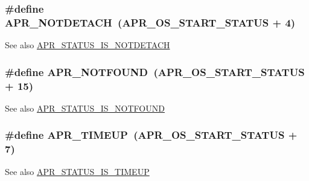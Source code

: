\subsubsection[{\texorpdfstring{A\+P\+R\+\_\+\+N\+O\+T\+D\+E\+T\+A\+CH}{APR_NOTDETACH}}]{\setlength{\rightskip}{0pt plus 5cm}\#define A\+P\+R\+\_\+\+N\+O\+T\+D\+E\+T\+A\+CH~({\bf A\+P\+R\+\_\+\+O\+S\+\_\+\+S\+T\+A\+R\+T\+\_\+\+S\+T\+A\+T\+US} + 4)}\hypertarget{group___a_p_r___error_ga83b8407fb5de5840f51dfd2c1439987b}{}\label{group___a_p_r___error_ga83b8407fb5de5840f51dfd2c1439987b}
\begin{DoxySeeAlso}{See also}
\hyperlink{group___a_p_r___s_t_a_t_u_s___i_s_gaa1700876a02293e3ed905fa03f360bbf}{A\+P\+R\+\_\+\+S\+T\+A\+T\+U\+S\+\_\+\+I\+S\+\_\+\+N\+O\+T\+D\+E\+T\+A\+CH} 
\end{DoxySeeAlso}
\subsubsection[{\texorpdfstring{A\+P\+R\+\_\+\+N\+O\+T\+F\+O\+U\+ND}{APR_NOTFOUND}}]{\setlength{\rightskip}{0pt plus 5cm}\#define A\+P\+R\+\_\+\+N\+O\+T\+F\+O\+U\+ND~({\bf A\+P\+R\+\_\+\+O\+S\+\_\+\+S\+T\+A\+R\+T\+\_\+\+S\+T\+A\+T\+US} + 15)}\hypertarget{group___a_p_r___error_ga9bd83273ff02f31f71fb4dc6f29df4a9}{}\label{group___a_p_r___error_ga9bd83273ff02f31f71fb4dc6f29df4a9}
\begin{DoxySeeAlso}{See also}
\hyperlink{group___a_p_r___s_t_a_t_u_s___i_s_ga0e6bd21f26cdce4ab23618816a1b6def}{A\+P\+R\+\_\+\+S\+T\+A\+T\+U\+S\+\_\+\+I\+S\+\_\+\+N\+O\+T\+F\+O\+U\+ND} 
\end{DoxySeeAlso}
\subsubsection[{\texorpdfstring{A\+P\+R\+\_\+\+T\+I\+M\+E\+UP}{APR_TIMEUP}}]{\setlength{\rightskip}{0pt plus 5cm}\#define A\+P\+R\+\_\+\+T\+I\+M\+E\+UP~({\bf A\+P\+R\+\_\+\+O\+S\+\_\+\+S\+T\+A\+R\+T\+\_\+\+S\+T\+A\+T\+US} + 7)}\hypertarget{group___a_p_r___error_ga9ac087c25ffb0d3bb4d75bee36709853}{}\label{group___a_p_r___error_ga9ac087c25ffb0d3bb4d75bee36709853}
\begin{DoxySeeAlso}{See also}
\hyperlink{group___a_p_r___s_t_a_t_u_s___i_s_gaa49ad314454d0d03722ebe8955c40395}{A\+P\+R\+\_\+\+S\+T\+A\+T\+U\+S\+\_\+\+I\+S\+\_\+\+T\+I\+M\+E\+UP} 
\end{DoxySeeAlso}
